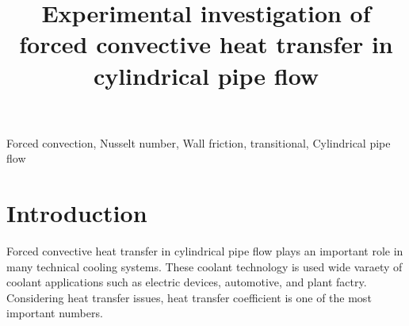 \documentclass[conference]{IEEEtran}
\begin{document}
\title{Experimental investigation of forced convective heat transfer in cylindrical pipe flow\\
}

\author{
}

\maketitle


\begin{IEEEkeywords}
Forced convection, Nusselt number, Wall friction, transitional, Cylindrical pipe flow
\end{IEEEkeywords}

\section{Introduction}
Forced convective heat transfer in cylindrical pipe flow plays an important role in many technical cooling systems.
These coolant technology is used wide varaety of coolant applications such as electric devices, automotive, and plant factry.
Considering heat transfer issues, heat transfer coefficient is one of the most important numbers.
\end{document}
